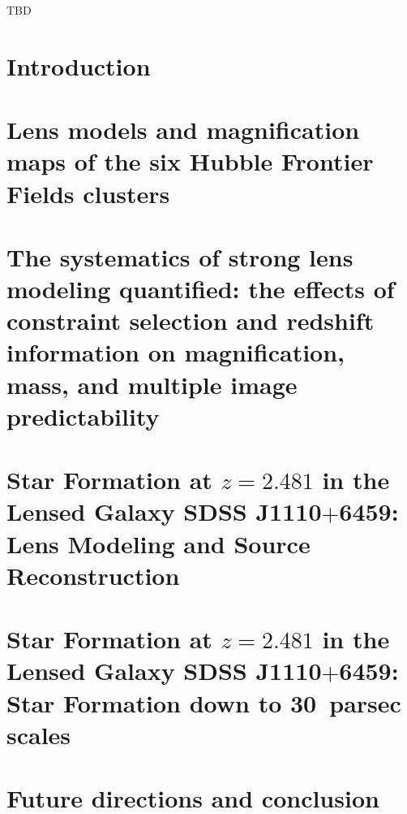 \documentclass[reqno,12pt,oneside]{report} %
\theoremstyle{plain}
\theoremstyle{definition}
\theoremstyle{remark}
\numberwithin{theorem}{chapter}     %
\begin{document}
\startabstractpage
%
TBD
\label{Abstract}

\startthechapters 

 \chapter{Introduction}
 \label{chap:Intro}
 

\chapter{Lens models and magnification maps of the six Hubble Frontier Fields clusters}
\label{chap:hff_clusters}

 
\chapter{The systematics of strong lens modeling quantified: the effects of constraint selection and redshift information on magnification, mass, and multiple image predictability}
\label{chap:ares_systematics}


\chapter{Star Formation at $z=2.481$ in the Lensed Galaxy SDSS J1110$+$6459: Lens Modeling and Source Reconstruction}
\label{chap:s1110}


\chapter{Star Formation at $z=2.481$ in the Lensed Galaxy SDSS J1110$+$6459: Star Formation down to 30~parsec scales}
\label{chap:clumps}
%

\chapter{Future directions and conclusion}
\end{document}
